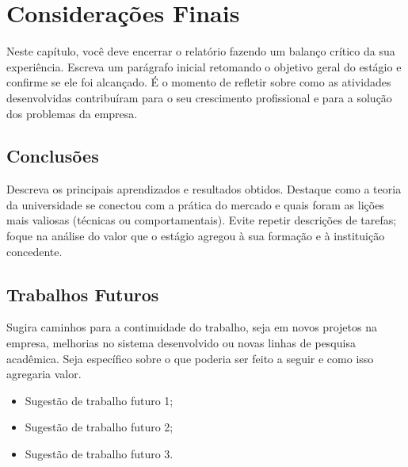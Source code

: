 
\chapter{Considerações Finais}
\label{cap:consideracoes}

Neste capítulo, você deve encerrar o relatório fazendo um balanço crítico da sua experiência. 
Escreva um parágrafo inicial retomando o objetivo geral do estágio e confirme se ele foi alcançado.
É o momento de refletir sobre como as atividades desenvolvidas contribuíram para o seu crescimento 
profissional e para a solução dos problemas da empresa.

\section{Conclusões}
\label{sec:conclusoes}

Descreva os principais aprendizados e resultados obtidos. Destaque como a teoria da universidade
se conectou com a prática do mercado e quais foram as lições mais valiosas (técnicas ou comportamentais). 
Evite repetir descrições de tarefas; foque na análise do valor que o estágio agregou à sua formação e à instituição concedente.


\section{Trabalhos Futuros}
\label{sec:trabalhos-futuros}

Sugira caminhos para a continuidade do trabalho, seja em novos projetos na empresa, 
melhorias no sistema desenvolvido ou novas linhas de pesquisa acadêmica. 
Seja específico sobre o que poderia ser feito a seguir e como isso agregaria valor.

\begin{itemize}
    \item Sugestão de trabalho futuro 1;
    \item Sugestão de trabalho futuro 2;
    \item Sugestão de trabalho futuro 3.
\end{itemize}
